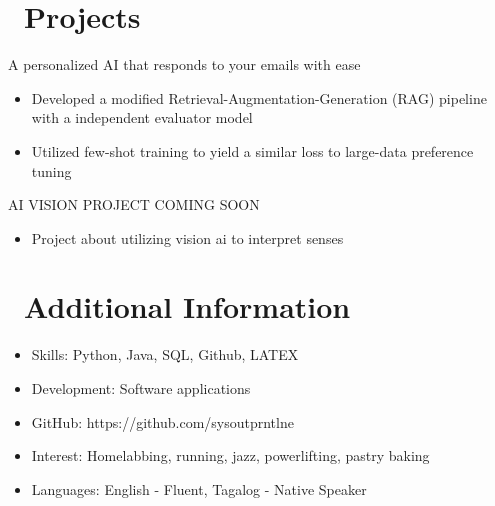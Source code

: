 \documentclass{resume}
\begin{document}
\section{\faPencil\ Projects}
A personalized AI that responds to your emails with ease
\begin{itemize}
  \item Developed a modified Retrieval-Augmentation-Generation (RAG) pipeline with a independent evaluator model
  \item Utilized few-shot training to yield a similar loss to large-data preference tuning
\end{itemize}


AI VISION PROJECT COMING SOON

\begin{itemize}
  \item Project about utilizing vision ai to interpret senses
\end{itemize}




\section{\faCogs\ Additional Information}
\begin{itemize}[parsep=0.5ex]
  \item Skills: Python, Java, SQL, Github, LATEX
  \item Development: Software applications
  \item GitHub: https://github.com/sysoutprntlne
  \item Interest: Homelabbing, running, jazz, powerlifting, pastry baking
  \item Languages: English - Fluent, Tagalog - Native Speaker
\end{itemize}






%
%
\end{document}
